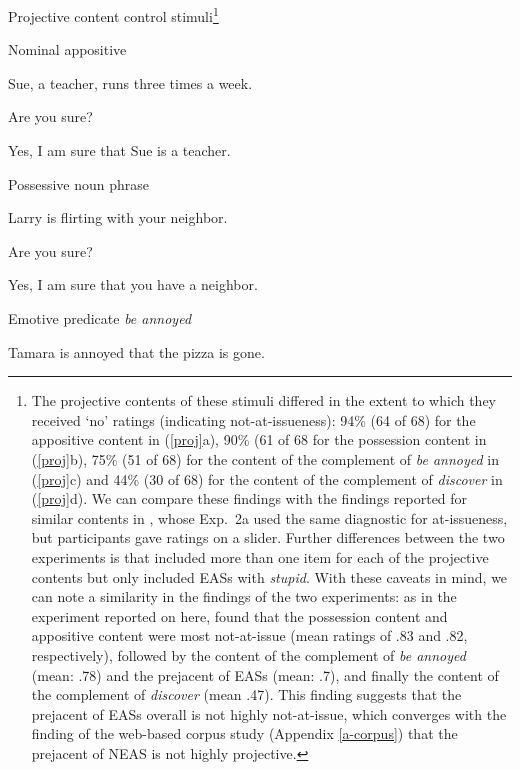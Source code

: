 \documentclass[11pt,fleqn]{article}
\newcommand{\6}{\mbox{$[\hspace*{-.6mm}[$}}
\newcommand{\9}{\mbox{$]\hspace*{-.6mm}]$}}
\begin{document}
\begin{exe}
\ex\label{proj} Projective content control stimuli\footnote{The projective contents of these stimuli differed in the extent to which they received `no' ratings (indicating not-at-issueness): 94\% (64 of 68) for the appositive content in (\ref{proj}a), 90\% (61 of 68 for the possession content in (\ref{proj}b), 75\% (51 of 68) for the content of the complement of {\em be annoyed} in (\ref{proj}c) and 44\% (30 of 68) for the content of the  complement of {\em discover} in (\ref{proj}d). We can compare these findings with the findings reported for similar contents in \citealt{tbd-variability}, whose Exp.~2a used the same diagnostic for at-issueness, but participants gave ratings on a slider. Further differences between the two experiments is that \citealt{tbd-variability} included more than one item for each of the projective contents but only included EASs with {\em stupid}. With these caveats in mind, we can note a similarity in the findings of the two experiments: as in the experiment reported on here, \citet{tbd-variability} found that the possession content and appositive content were most not-at-issue (mean ratings of .83 and .82, respectively), followed by the content of the  complement of {\em be annoyed} (mean: .78) and the prejacent of EASs (mean: .7), and finally the content of the  complement of {\em discover} (mean .47). This finding suggests that the prejacent of EASs overall is not highly not-at-issue, which converges with the finding of the web-based corpus study (Appendix \ref{a-corpus}) that the prejacent of NEAS is not highly projective.}

\begin{xlist}

\ex Nominal appositive
\begin{xlist}
 Sue, a teacher, runs three times a week.

 Are you sure?

 Yes, I am sure that Sue is a teacher.
\end{xlist}


\ex Possessive noun phrase
\begin{xlist}
 Larry is flirting with your neighbor.

 Are you sure?

 Yes, I am sure that you have a neighbor.
\end{xlist}

\ex Emotive predicate {\em be annoyed} 
\begin{xlist}
 Tamara is annoyed that the pizza is gone.


\end{xlist}
\end{xlist}
\end{exe}
\end{document}
